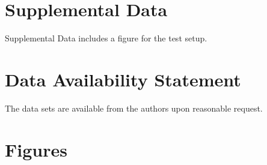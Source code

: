 \documentclass[utf8]{FrontiersinHarvard} %
\begin{document}
\section*{Supplemental Data}
Supplemental Data includes a figure for the test setup. 
 

\section*{Data Availability Statement}
The data sets are available from the authors upon reasonable request.






\clearpage
\section*{Figures}

\end{document}
